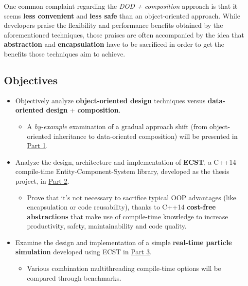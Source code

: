 \documentclass[twoside, 12pt, a4paper, openright]{book}
\providecommand{\tightlist}{%
  \setlength{\itemsep}{0pt}\setlength{\parskip}{0pt}}
\begin{document}
One common complaint regarding the \emph{DOD + composition} approach is
that it seems \textbf{less convenient} and \textbf{less safe} than an
object-oriented approach. While developers praise the flexibility and
performance benefits obtained by the aforementioned techniques, those
praises are often accompanied by the idea that \textbf{abstraction} and
\textbf{encapsulation} have to be sacrificed in order to get the
benefits those techniques aim to achieve.

\subsection{Objectives}\label{objectives}

\begin{itemize}
\item
  Objectively analyze \textbf{object-oriented design} techniques versus
  \textbf{data-oriented design} + \textbf{composition}.

  \begin{itemize}
  \tightlist
  \item
    A \emph{by-example} examination of a gradual approach shift (from
    object-oriented inheritance to data-oriented composition) will be
    presented in \protect\hyperlink{ecs_part_overview}{Part 1}.
  \end{itemize}
\item
  Analyze the design, architecture and implementation of \textbf{ECST},
  a C++14 compile-time Entity-Component-System library, developed as the
  thesis project, in \protect\hyperlink{part2_ecst}{Part 2}.

  \begin{itemize}
  \tightlist
  \item
    Prove that it's not necessary to sacrifice typical OOP advantages
    (like encapsulation or code reusability), thanks to C++14
    \textbf{cost-free abstractions} that make use of compile-time
    knowledge to increase productivity, safety, maintainability and code
    quality.
  \end{itemize}
\item
  Examine the design and implementation of a simple \textbf{real-time
  particle simulation} developed using ECST in
  \protect\hyperlink{part3_sim}{Part 3}.

  \begin{itemize}
  \tightlist
  \item
    Various combination multithreading compile-time options will be
    compared through benchmarks.
  \end{itemize}
\end{itemize}
\end{document}
